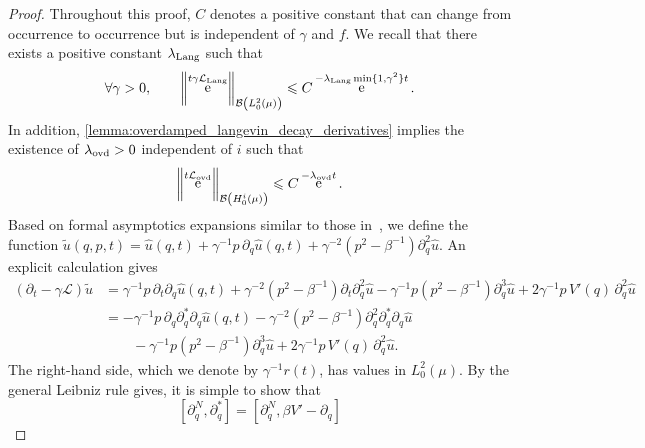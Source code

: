 \documentclass[11pt,a4paper]{article}
\DeclareMathOperator{\e}{e}
\newcommand{\commut}[2]{[#1, #2]}
\theoremstyle{plain}
\numberwithin{equation}{section}
\renewcommand{\leq}{\leqslant}
\begin{document}
\begin{proof}
    Throughout this proof, $C$ denotes a positive constant that can change from occurrence to occurrence but is independent of $\gamma$ and $f$.
    We recall that there exists a positive constant $\lambda_{\rm Lang}$ such that~\cite{roussel2018spectral,pavliotis2011applied}
    \begin{equation}
        \label{eq:decay_langevin}
        \forall \gamma > 0, \qquad
        \norm{\e^{t \gamma \mathcal L_{\rm Lang}}}[\mathcal B\left(L^2_0(\mu)\right)] \leq C \e^{- \lambda_{\rm Lang} \min\{1,\gamma^2\} t}.
    \end{equation}
    In addition, \cref{lemma:overdamped_langevin_decay_derivatives} implies the existence of $\lambda_{\rm ovd} > 0$ independent of $i$ such that
    \begin{equation}
        \label{eq:decay_ovd}
        \norm{\e^{t \mathcal L_{\rm ovd}}}[\mathcal B\left(H^i_0(\mu)\right)] \leq C \e^{- \lambda_{\rm ovd} t}.
    \end{equation}
    Based on formal asymptotics expansions similar to those in~\cite[Chapter 6]{pavliotis2011applied},
    we define the function
    \(
        \widetilde u(q, p, t) =
        \widehat u(q, t)
        + \gamma^{-1} p \, \partial_q \widehat u(q, t)
        + \gamma^{-2} (p^2 - \beta^{-1}) \partial_q^{2} \widehat u.
    \)
    An explicit calculation gives
    \begin{align*}
        (\partial_t - \gamma \mathcal L) \widetilde u
        &= \gamma^{-1} p \, \partial_t \partial_q \widehat u(q, t) + \gamma^{-2} (p^2 - \beta^{-1}) \partial_t \partial_q^{2} \widehat u
        - \gamma^{-1} p (p^2 - \beta^{-1}) \partial_q^{3} \widehat u + 2 \gamma^{-1} p \, V'(q) \, \partial_q^2 \widehat u \\
        &= - \gamma^{-1} p \, \partial_q \partial_q^* \partial_q \widehat u(q, t) - \gamma^{-2} (p^2 - \beta^{-1})  \partial_q^{2} \partial_q^* \partial_q \widehat u \\
        &\qquad - \gamma^{-1} p (p^2 - \beta^{-1}) \partial_q^{3} \widehat u + 2 \gamma^{-1} p \, V'(q) \, \partial_q^2 \widehat u.
    \end{align*}
    The right-hand side, which we denote by $\gamma^{-1} r(t)$, has values in $L^2_0(\mu)$.
    By the general Leibniz rule gives,
    it is simple to show that
    \begin{equation}
        \label{eq:commutators_derivatives}
        \commut{\partial_q^N}{\partial_q^*}
        = \commut{\partial_q^N}{\beta V' - \partial_q}

\end{equation}
\end{proof}
\end{document}
